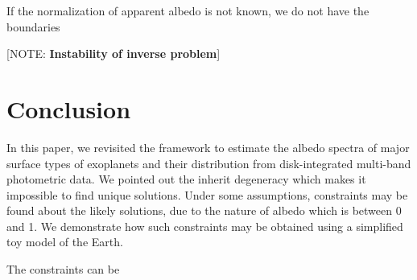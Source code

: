 \documentclass[iop,numberedappendix,apj,]{emulateapj}
\def\memoYF#1{\color{red}[NOTE: {\bf #1}]\color{black}}
\begin{document}
If the normalization of apparent albedo is not known, we do not have the boundaries 



\memoYF{Instability of inverse problem}

\section{Conclusion}
\label{s:conclusion}

In this paper, we revisited the framework to estimate the albedo spectra of major surface types of exoplanets and their distribution from disk-integrated multi-band photometric data. 
We pointed out the inherit degeneracy which makes it impossible to find unique solutions. 
Under some assumptions, constraints may be found about the likely solutions, due to the nature of albedo which is between 0 and 1. 
We demonstrate how such constraints may be obtained using a simplified toy model of the Earth. 

The constraints can be 


\end{document}
